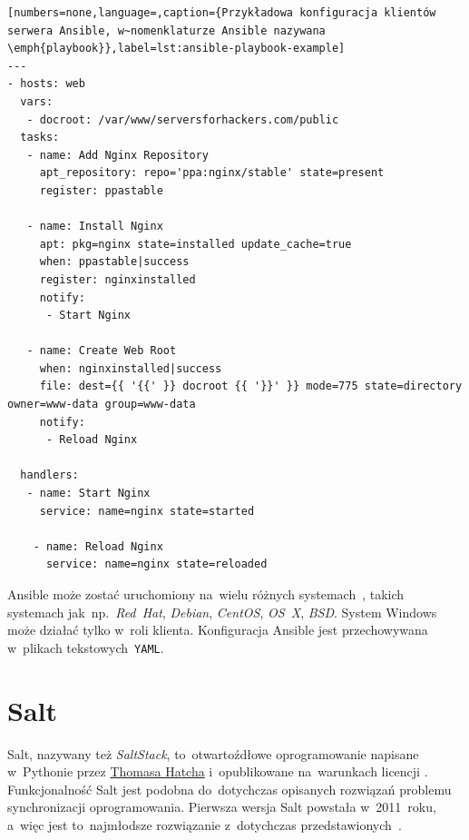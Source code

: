 \documentclass[thesis]{subfiles}
\begin{document}
\begin{lstlisting}[numbers=none,language=,caption={Przykładowa konfiguracja klientów serwera Ansible, w~nomenklaturze Ansible nazywana \emph{playbook}},label=lst:ansible-playbook-example]
---
- hosts: web
  vars:
   - docroot: /var/www/serversforhackers.com/public
  tasks:
   - name: Add Nginx Repository
     apt_repository: repo='ppa:nginx/stable' state=present
     register: ppastable

   - name: Install Nginx
     apt: pkg=nginx state=installed update_cache=true
     when: ppastable|success
     register: nginxinstalled
     notify:
      - Start Nginx

   - name: Create Web Root
     when: nginxinstalled|success
     file: dest={{ '{{' }} docroot {{ '}}' }} mode=775 state=directory owner=www-data group=www-data
     notify:
      - Reload Nginx

  handlers:
   - name: Start Nginx
     service: name=nginx state=started

    - name: Reload Nginx
      service: name=nginx state=reloaded
\end{lstlisting}

Ansible może zostać uruchomiony na~wielu różnych systemach~, takich systemach jak~np.~\emph{Red~Hat}, \emph{Debian}, \emph{CentOS}, \emph{OS~X}, \emph{BSD}. System Windows może działać tylko w~roli klienta. Konfiguracja Ansible jest przechowywana w~plikach tekstowych~\texttt{YAML}.


\section{Salt}
\label{sec:salt}

Salt, nazywany też \emph{SaltStack}, to~otwartoźdłowe oprogramowanie napisane w~Pythonie przez \href{https://www.linkedin.com/in/thhatch/}{Thomasa Hatcha} i~opublikowane na~warunkach licencji . Funkcjonalność Salt jest podobna do~dotychczas opisanych rozwiązań problemu synchronizacji oprogramowania. Pierwsza wersja Salt powstała w~2011~roku, a~więc jest to~najmłodsze rozwiązanie z~dotychczas przedstawionych~\cite{saltstack}.
\end{document}
